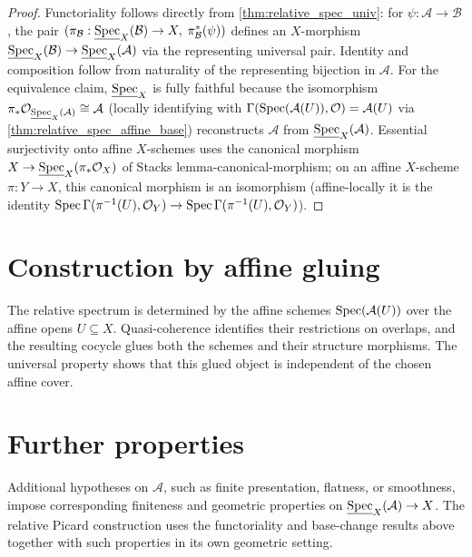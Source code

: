 \begin{proof}
  Functoriality follows directly from \cref{thm:relative_spec_univ}: for
  \(\psi : \mathcal{A} \to \mathcal{B}\), the pair
  \((\pi_{\mathcal{B}} : \underline{\operatorname{Spec}}_X(\mathcal{B}) \to X, \;
  \pi_{\mathcal{B}}^*(\psi))\) defines an \(X\)-morphism
  \(\underline{\operatorname{Spec}}_X(\mathcal{B}) \to \underline{\operatorname{Spec}}_X(\mathcal{A})\) via the
  representing universal pair. Identity and composition follow from naturality of the
  representing bijection in \(\mathcal{A}\). For the equivalence claim, \(\underline{\operatorname{Spec}}_X\)
  is fully faithful because the isomorphism
  \(\pi_* \mathcal{O}_{\underline{\operatorname{Spec}}_X(\mathcal{A})} \cong \mathcal{A}\)
  (locally identifying with \(\Gamma(\operatorname{Spec}(\mathcal{A}(U)),\mathcal{O}) = \mathcal{A}(U)\)
  via \cref{thm:relative_spec_affine_base}) reconstructs \(\mathcal{A}\) from
  \(\underline{\operatorname{Spec}}_X(\mathcal{A})\). Essential surjectivity onto affine \(X\)-schemes uses
  the canonical morphism \(X \to \underline{\operatorname{Spec}}_X(\pi_*\mathcal{O}_X)\) of Stacks
  lemma-canonical-morphism; on an affine \(X\)-scheme \(\pi : Y \to X\), this canonical
  morphism is an isomorphism (affine-locally it is the identity
  \(\operatorname{Spec}\Gamma(\pi^{-1}(U), \mathcal{O}_Y) \to \operatorname{Spec}\Gamma(\pi^{-1}(U), \mathcal{O}_Y)\)).
\end{proof}

\section{Construction by affine gluing}
\label{sec:relspec_lean_encoding}

The relative spectrum is determined by the affine schemes
\(\operatorname{Spec}(\mathcal{A}(U))\) over the affine opens \(U \subseteq X\). Quasi-coherence
identifies their restrictions on overlaps, and the resulting cocycle glues both the
schemes and their structure morphisms. The universal property shows that this glued
object is independent of the chosen affine cover.

\section{Further properties}
\label{sec:relspec_out_of_scope}

Additional hypotheses on \(\mathcal{A}\), such as finite presentation, flatness, or
smoothness, impose corresponding finiteness and geometric properties on
\(\underline{\operatorname{Spec}}_X(\mathcal{A}) \to X\). The relative Picard construction uses the
functoriality and base-change results above together with such properties in its own
geometric setting.
